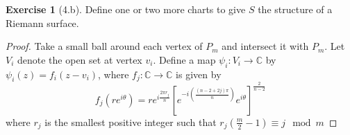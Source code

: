 \documentclass{amsart}
\theoremstyle{definition}
\newtheorem{exercise}[theorem]{Exercise}
\theoremstyle{remark}
\begin{document}
    \begin{exercise}[4.b]
        Define one or two more charts to give $S$ the structure of a Riemann
        surface.
    \end{exercise}
    \begin{proof}
        Take a small ball around each vertex of $P_m$ and intersect it
        with $P_m$. Let $V_i$ denote the open set at vertex $v_i$.
        Define a map $\psi_i \colon V_i \to \mathbb{C}$ by
        $\psi_i (z) = f_i \left( z - v_i \right) $, where
        $f_j \colon \mathbb{C} \to \mathbb{C}$ is given by
        \[
        f_j(re^{i \theta} ) = r e^{i \frac{2 \pi r_j}{n}} \left[ 
        e^{- i \left( \frac{(n-2 + 2j)\pi}{n} \right) } e^{i \theta}\right]^{\frac{2}{n-2}}
        \] 
        where $r_j$ is the smallest positive integer such that
        $r_j \left( \frac{m}{2}-1 \right) \equiv j \mod{m} $
    \end{proof}












\end{document}
